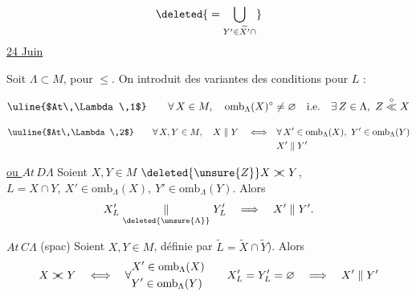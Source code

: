 \[
\deleted{{}=\bigcup_{Y'\in\widetilde{X'}\cap}}
\]
\uline{24 Juin}

Soit $\Lambda\subset M$,  pour $\leq$. On introduit des variantes des conditions  pour $L$ :

\[
\text{\uline{$At\,\Lambda\,1$}}\qquad \forall\,X\in M,\quad \mathrm{omb}_{\Lambda}(X)^\circ\ne\varnothing\quad\text{i.e.}\quad \exists\,Z\in\Lambda,\ Z\overset{\circ}{\ll} X
\]

\[
\begin{aligned}
\text{\uuline{$At\,\Lambda\,2$}}\qquad \forall\,X,Y\in M,\quad X\parallel Y\quad\Longleftrightarrow\quad &\forall\,X'\in \mathrm{omb}_{\Lambda}(X),\ Y'\in \mathrm{omb}_{\Lambda}(Y)\\
&X'\parallel Y'
\end{aligned}
\]

 \uline{ou $At\,D\Lambda$} Soient $X,Y\in M$   $\deleted{\unsure{Z}}X\mathrel{\rlap{$>$}<} Y$,  $L=X\cap Y,\ X'\in \mathrm{omb}_{\Lambda}(X),\ Y'\in \mathrm{omb}_{\Lambda}(Y)$. Alors
\[
X'_L\mathrel{\underset{\deleted{\unsure{\Lambda}}}{\parallel}}Y'_L\quad\Longrightarrow\quad X'\parallel Y'.
\]

\uline{$At\,C\Lambda$} (spac) Soient $X,Y\in M$,   définie par $\widetilde L=\widetilde X\cap\widetilde Y$). Alors
\[
X\mathrel{\rlap{$>$}<} Y\quad\Longleftrightarrow\quad
\forall\begin{aligned}&X'\in \mathrm{omb}_{\Lambda}(X)\\&Y'\in \mathrm{omb}_{\Lambda}(Y)\end{aligned}
\qquad X'_L=Y'_L=\varnothing\quad\Longrightarrow\quad X'\parallel Y'
\]

